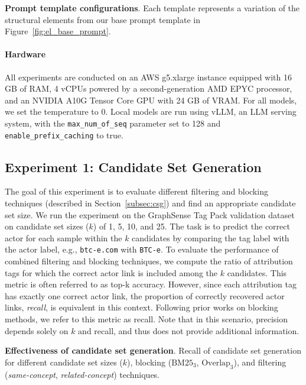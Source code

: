 \begin{table}
    \centering
    \caption{\textbf{Prompt template configurations}. Each template represents a variation of the structural elements from our base prompt template in Figure~\ref{fig:el_base_prompt}.}
    
    \label{tab:el_template_config}
\end{table}

\paragraph{Hardware} All experiments are conducted on an AWS g5.xlarge instance equipped with 16 GB of RAM, 4 vCPUs powered by a second-generation AMD EPYC processor, and an NVIDIA A10G Tensor Core GPU with 24 GB of VRAM. For all models, we set the temperature to 0. Local models are run using vLLM\cite{Kwon2023}, an LLM serving system, with the \texttt{max\_num\_of\_seq} parameter set to 128 and \texttt{enable\_prefix\_caching} to true.

\subsection{Experiment 1: Candidate Set Generation}
\label{sec:exp1}

The goal of this experiment is to evaluate different filtering and blocking techniques (described in Section~\ref{subsec:csg}) and find an appropriate candidate set size. We run the experiment on the GraphSense Tag Pack validation dataset on candidate set sizes ($k$) of 1, 5, 10, and 25. The task is to predict the correct actor for each sample within the $k$ candidates by comparing the tag label with the actor label, e.g., \texttt{btc-e.com} with \texttt{BTC-e}. To evaluate the performance of combined filtering and blocking techniques, we compute the ratio of attribution tags for which the correct actor link is included among the $k$ candidates. This metric is often referred to as top-k accuracy. However, since each attribution tag has exactly one correct actor link, the proportion of correctly recovered actor links, \emph{recall}, is equivalent in this context. Following prior works \cite{Papadakis2020, Paulsen2023} on blocking methods, we refer to this metric as recall. Note that in this scenario, precision depends solely on $k$ and recall, and thus does not provide additional information.

\begin{table}
    \centering
    \caption{\textbf{Effectiveness of candidate set generation}. Recall of candidate set generation for different candidate set sizes ($k$), blocking ($\text{BM25}_3$, $\text{Overlap}_3$), and filtering (\emph{same-concept}, \emph{related-concept}) techniques.}
    
    \label{tab:cg_recall_scores}
\end{table}

